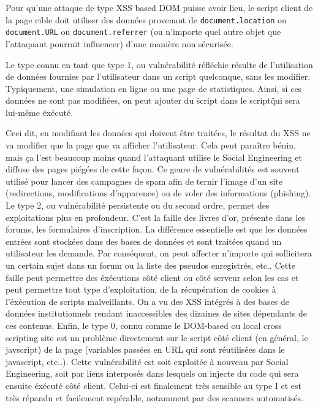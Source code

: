 \documentclass[a4paper,12pt]{report}
\begin{document}
  Pour qu'une attaque de type XSS based DOM puisse avoir lieu, le script client de la page cible doit utiliser des données provenant de \lstinline{document.location} ou \lstinline{document.URL} ou \lstinline{document.referrer} (ou n'importe quel autre objet que l'attaquant pourrait influencer) d'une manière non sécurisée.

  Le type connu en tant que type 1, ou vulnérabilité réfléchie résulte de l'utilisation de données fournies par l'utilisateur dans un script quelconque, sans les modifier. Typiquement, une simulation en ligne ou une page de statistiques. Ainsi, si ces données ne sont pas modifiées, on peut ajouter du \"script dans le script\" qui sera lui-même éxécuté.

  Ceci dit, en modifiant les données qui doivent être traitées, le résultat du XSS ne va modifier que la page que va afficher l'utilisateur. Cela peut paraître bénin, mais ça l'est beaucoup moins quand l'attaquant utilise le Social Engineering et diffuse des pages piégées de cette façon. Ce genre de vulnérabilités est souvent utilisé pour lancer des campagnes de spam afin de ternir l'image d'un site (redirections, modifications d'apparence) ou de voler des informations (phishing).
  Le type 2, ou vulnérabilité persistente ou du second ordre, permet des exploitations plus en profondeur. C'est la faille des livres d'or, présente dans les forums, les formulaires d'inscription. La différence essentielle est que les données entrées sont stockées dans des bases de données et sont traitées quand un utilisateur les demande. Par conséquent, on peut affecter n'importe qui sollicitera un certain sujet dans un forum ou la liste des pseudos enregistrés, etc.. Cette faille peut permettre des éxécutions côté client ou côté serveur selon les cas et peut permettre tout type d'exploitation, de la récupération de cookies à l'éxécution de scripts malveillants. On a vu des XSS intégrés à des bases de données institutionnels rendant inaccessibles des dizaines de sites dépendants de ces contenus.
  Enfin, le type 0, connu comme le DOM-based ou local cross scripting site est un problème directement sur le script côté client (en général, le javscript) de la page (variables passées en URL qui sont réutilisées dans le javascript, etc..). Cette vulnérabilité est soit exploitée à nouveau par Social Engineering, soit par liens interposés dans lesquels on injecte du code qui sera ensuite éxécuté côté client. Celui-ci est finalement très sensible au type I et est très répandu et facilement repérable, notamment par des scanners automatisés.
\end{document}
